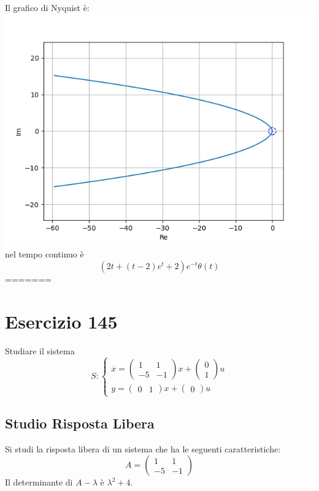 \documentclass{article}
\begin{document}
Il grafico di Nyquist è:
\includegraphics[scale = 0.5]{figures/nyquist_1238369.png}nel tempo continuo è \[ \left(2 t + \left(t - 2\right) e^{t} + 2\right) e^{- t} \theta\left(t\right) \]
=======
\section{Esercizio 145 }
 Studiare il sistema \[S:\begin{cases}\overset{\cdot}{x} = \left(\begin{matrix}1 & 1\\-5 & -1\end{matrix}\right) x+ \left(\begin{matrix}0\\1\end{matrix}\right)u\\y = \left(\begin{matrix}0 & 1\end{matrix}\right) x +\left(\begin{matrix}0\end{matrix}\right) u\end{cases}\]\subsection{Studio Risposta Libera}
Si studi la risposta libera di un sistema che ha le seguenti caratteristiche: \[A = \left(\begin{matrix}1 & 1\\-5 & -1\end{matrix}\right)\]
Il determinante di $A-\lambda$ è $ \lambda^{2} + 4 $.
\end{document}
